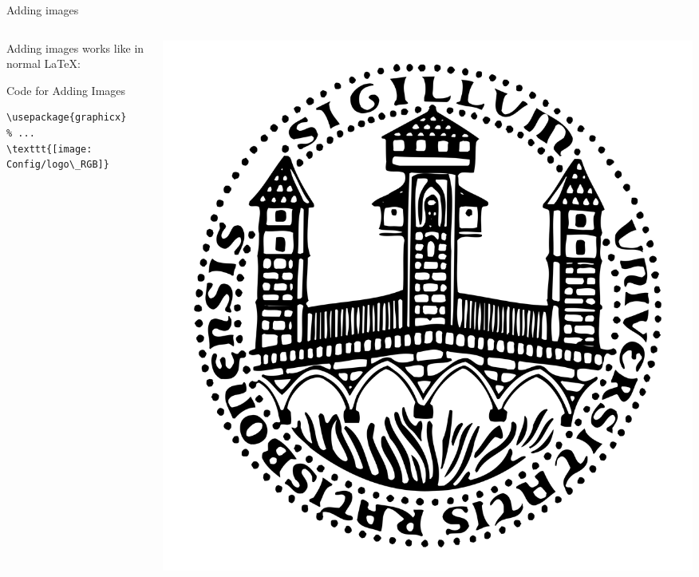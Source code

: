 
\begin{frame}[fragile]{Adding images}
\begin{columns}  %
\begin{column}{0.7\textwidth}
Adding images works like in normal \LaTeX:
\begin{block}{Code for Adding Images}
\begin{verbatim}
\usepackage{graphicx}
% ...
\texttt{[image: Config/logo\_RGB]}
\end{verbatim}
\end{block}
\end{column}
\begin{column}{0.3\textwidth}
\includegraphics[width=\textwidth]{Config/logo_transparent.png}
\end{column}
\end{columns}
\end{frame}


